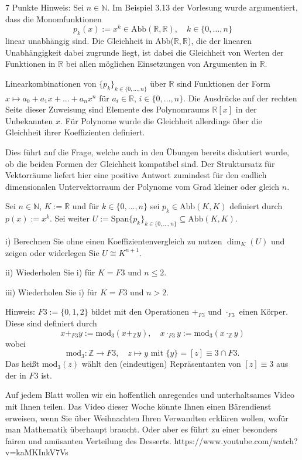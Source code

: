 \documentclass{../problemset}
\author{Michael van Straten}
\begin{document}
\maketitle

\begin{problem}{7 Punkte}
Hinweis: Sei $n \in \mathbb{N}$. Im Beispiel 3.13 der Vorlesung wurde argumentiert, dass die Monomfunktionen
\[ p_k(x) := x^k \in \text{Abb}(\mathbb{R}, \mathbb{R}), \quad k \in \{0, \ldots, n\} \]
linear unabhängig sind. Die Gleichheit in Abb($\mathbb{R}, \mathbb{R}$), die der linearen Unabhängigkeit dabei zugrunde liegt, ist dabei die Gleichheit von Werten der Funktionen in $\mathbb{R}$ bei allen möglichen Einsetzungen von Argumenten in $\mathbb{R}$.

Linearkombinationen von $\{p_k\}_{k\in\{0,\ldots,n\}}$ über $\mathbb{R}$ sind Funktionen der Form $x \mapsto a_0 + a_1x + \ldots + a_nx^n$ für $a_i \in \mathbb{R}$, $i \in \{0, \ldots, n\}$. Die Ausdrücke auf der rechten Seite dieser Zuweisung sind Elemente des Polynomraums $\mathbb{R}[x]$ in der Unbekannten $x$. Für Polynome wurde die Gleichheit allerdings über die Gleichheit ihrer Koeffizienten definiert.

Dies führt auf die Frage, welche auch in den Übungen bereits diskutiert wurde, ob die beiden Formen der Gleichheit kompatibel sind. Der Struktursatz für Vektorräume liefert hier eine positive Antwort zumindest für den endlich dimensionalen Untervektorraum der Polynome vom Grad kleiner oder gleich $n$.

Sei $n \in \mathbb{N}$, $K := \mathbb{R}$ und für $k \in \{0, \ldots, n\}$ sei $p_k \in \text{Abb}(K, K)$ definiert durch $p(x) := x^k$. Sei weiter $U := \text{Span}\{p_k\}_{k\in\{0,\ldots,n\}} \subseteq \text{Abb}(K, K)$.

i) Berechnen Sie ohne einen Koeffizientenvergleich zu nutzen $\dim_K(U)$ und zeigen oder widerlegen Sie $U \cong K^{n+1}$.

ii) Wiederholen Sie i) für $K = F3$ und $n \leq 2$.

iii) Wiederholen Sie i) für $K = F3$ und $n > 2$.

Hinweis: $F3 := \{0, 1, 2\}$ bildet mit den Operationen $+_{F3}$ und $\cdot_{F3}$ einen Körper. Diese sind definiert durch
\[ x +_{F3} y := \text{mod}_3(x +_{\mathbb{Z}} y), \quad x \cdot_{F3} y := \text{mod}_3(x \cdot_{\mathbb{Z}} y) \]
wobei
\[ \text{mod}_3 : \mathbb{Z} \rightarrow F3, \quad z \mapsto y \text{ mit } \{y\} = [z] \equiv 3 \cap F3. \]
Das heißt $\text{mod}_3(z)$ wählt den (eindeutigen) Repräsentanten von $[z] \equiv 3$ aus der in $F3$ ist.

Auf jedem Blatt wollen wir ein hoffentlich anregendes und unterhaltsames Video mit Ihnen teilen. Das Video dieser Woche könnte Ihnen einen Bärendienst erweisen, wenn Sie über Weihnachten Ihren Verwandten erklären wollen, wofür man Mathematik überhaupt braucht. Oder aber es führt zu einer besonders fairen und amüsanten Verteilung des Desserts. https://www.youtube.com/watch?v=kaMKInkV7Vs
\end{problem}
\end{document}
